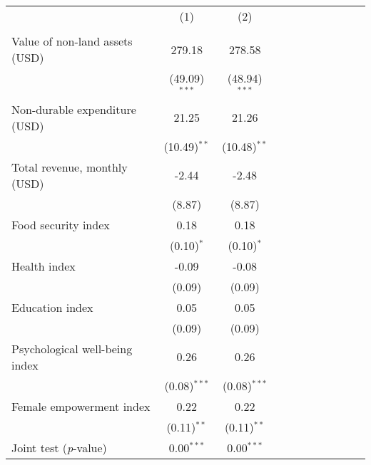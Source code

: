 {
\def\sym#1{\ifmmode^{#1}\else\(^{#1}\)\fi}
\begin{tabular}{l*{2}{SSSSS}}
\toprule
          &&\\
          &&\\
\midrule
Value of non-land assets (USD)&   279.18&   278.58\\
          &(49.09)$^{***}$&(48.94)$^{***}$\\
Non-durable expenditure (USD)&    21.25&    21.26\\
          &(10.49)$^{**}$&(10.48)$^{**}$\\
Total revenue, monthly (USD)&    -2.44&    -2.48\\
          &   (8.87)&   (8.87)\\
Food security index&     0.18&     0.18\\
          &(0.10)$^{*}$&(0.10)$^{*}$\\
Health index&    -0.09&    -0.08\\
          &   (0.09)&   (0.09)\\
Education index&     0.05&     0.05\\
          &   (0.09)&   (0.09)\\
Psychological well-being index&     0.26&     0.26\\
          &(0.08)$^{***}$&(0.08)$^{***}$\\
Female empowerment index&     0.22&     0.22\\
          &(0.11)$^{**}$&(0.11)$^{**}$\\
\midrule Joint test (\emph{p}-value)&0.00$^{***}$&0.00$^{***}$\\
\bottomrule
\end{tabular}
}
